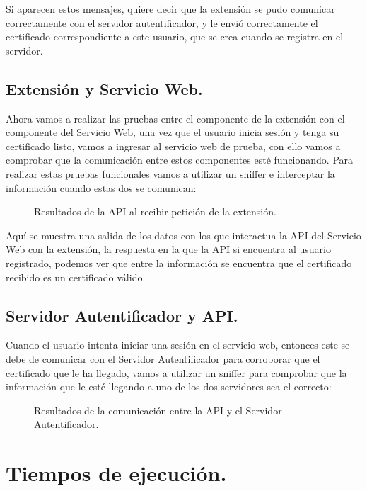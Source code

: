 \documentclass[12pt, a4paper, titlepage]{report}
\begin{document}
    	    Si aparecen estos mensajes, quiere decir que la extensión se pudo comunicar correctamente con el servidor autentificador, y le envió correctamente el certificado correspondiente a este usuario, que se crea cuando se registra en el servidor. 
    	    
    	    \subsection{Extensión y Servicio Web.}
    	    Ahora vamos a realizar las pruebas entre el componente de la extensión con el componente del Servicio Web, una vez que el usuario inicia sesión y tenga su certificado listo, vamos a ingresar al servicio web de prueba, con ello vamos a comprobar que la comunicación entre estos componentes esté funcionando. Para realizar estas pruebas funcionales vamos a utilizar un sniffer e interceptar la información cuando estas dos se comunican: 
    	    
    	    \begin{figure}[H]
    	        \centering
    	        \caption{Resultados de la API al recibir petición de la extensión.}
    	        \label{fig:outAPI}
    	    \end{figure}
    	    Aquí se muestra una salida de los datos con los que interactua la API del Servicio Web con la extensión, la respuesta en la que la API si encuentra al usuario registrado, podemos ver que entre la información se encuentra que el certificado recibido es un certificado válido. 
    	    
    	    \subsection{Servidor Autentificador y API.}
    	    Cuando el usuario intenta iniciar una sesión en el servicio web, entonces este se debe de comunicar con el Servidor Autentificador para corroborar que el certificado que le ha llegado, vamos a utilizar un sniffer para comprobar que la información que le esté llegando a uno de los dos servidores sea el correcto: 
    	    
    	    \begin{figure}[H]
    	        \centering
    	        \caption{Resultados de la comunicación entre la API y el Servidor Autentificador.}
    	        \label{fig:com2comp3}
    	    \end{figure}
	    
        \section{Tiempos de ejecución.}
	     
\end{document}
